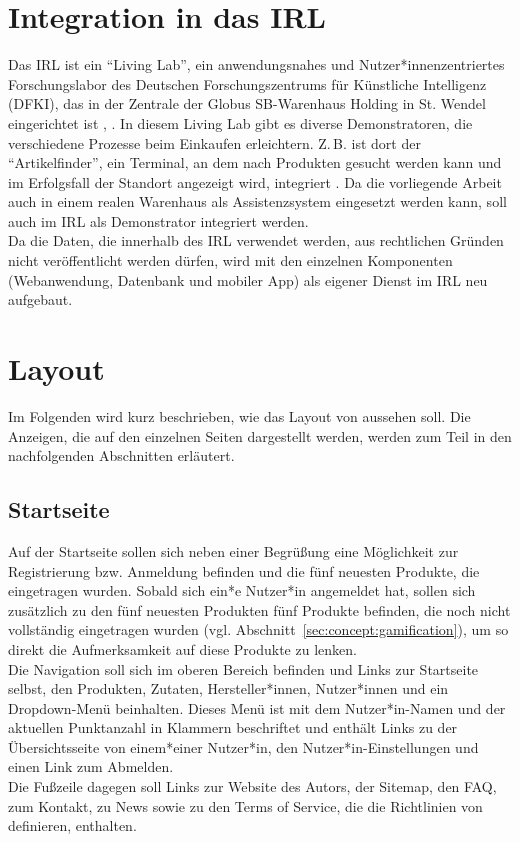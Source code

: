 \section{Integration in das \acl{IRL}}
\label{sec:concept:irl}

Das \acf{IRL} ist ein "`Living Lab"', ein 
anwendungsnahes und Nutzer*innenzentriertes Forschungslabor des Deutschen 
Forschungszentrums für Künstliche Intelligenz (DFKI), das in der Zentrale der 
Globus SB-Warenhaus Holding in St. Wendel eingerichtet ist , \cite{sskk09}.
In diesem Living Lab gibt es diverse Demonstratoren, die verschiedene Prozesse 
beim Einkaufen erleichtern. Z.\,B. ist dort der "`Artikelfinder"', ein 
Terminal, an dem nach Produkten gesucht werden kann und im Erfolgsfall der 
Standort angezeigt wird, integriert .
Da die vorliegende Arbeit auch in einem realen Warenhaus als Assistenzsystem 
eingesetzt werden kann, soll auch \name im \ac{IRL} als Demonstrator 
integriert werden.\\
Da die Daten, die innerhalb des \ac{IRL} verwendet werden, aus
rechtlichen Gründen nicht
veröffentlicht werden dürfen, wird \name mit den einzelnen Komponenten
(Webanwendung, Datenbank und mobiler App)
als eigener Dienst im \ac{IRL} neu aufgebaut.

\section{Layout}
\label{sec:concept:layout}

Im Folgenden wird kurz beschrieben, wie das Layout von \name aussehen soll.
Die Anzeigen, die auf den einzelnen Seiten dargestellt werden, werden zum Teil 
in den nachfolgenden Abschnitten erläutert.

\subsection{Startseite}
\label{sec:concept:dashboard}

Auf der Startseite
sollen sich neben einer Begrüßung eine Möglichkeit zur
Registrierung bzw. Anmeldung befinden und die fünf neuesten Produkte, die
eingetragen wurden.
Sobald sich ein*e Nutzer*in angemeldet hat, sollen sich zusätzlich
zu den fünf neuesten Produkten fünf Produkte befinden, die noch nicht 
vollständig eingetragen wurden
(vgl. Abschnitt~\ref{sec:concept:gamification}), um so direkt die Aufmerksamkeit
auf diese Produkte zu lenken.\\
Die Navigation soll sich im oberen Bereich befinden und Links zur Startseite selbst, den
Produkten, Zutaten, Hersteller*innen, Nutzer*innen und ein Dropdown-Menü beinhalten.
Dieses Menü ist mit dem
Nutzer*in-Namen und der aktuellen Punktanzahl in Klammern beschriftet
und enthält Links zu der
Übersichtsseite von einem*einer Nutzer*in, den Nutzer*in-Einstellungen
und einen Link zum Abmelden.\\
Die Fußzeile dagegen soll Links zur Website des Autors, der
Sitemap, den FAQ, zum Kontakt, zu News sowie zu den Terms of
Service, die die Richtlinien von \name definieren, enthalten.

